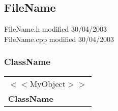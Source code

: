 \subsection{FileName}
{\footnotesize FileName.h modified  30/04/2003\\ FileName.cpp modified 30/04/2003}

\subsubsection{ClassName}
\begin{table}[h]
\begin{tabular}{|l|}\hline
$<<$MyObject$>>$\\
\textbf{ClassName}\\
\hline
\hline
\hline
\end{tabular}
\end{table}